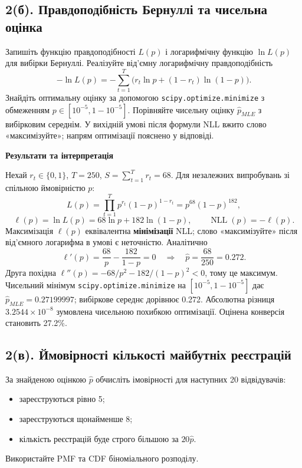 \documentclass[11pt,a4paper]{article}
\newcommand{\pythoncode}[1]{%
  \Needspace{6\baselineskip}
  \begin{tcolorbox}[enhanced,breakable,colback=black!2!white,colframe=black!15!white,
    colbacktitle=black!6!white,coltitle=accent,fonttitle=\bfseries\small,
    title=Код Python,title after break={Код Python (продовження)},boxrule=0.4pt,arc=1mm,left=2mm,right=2mm,top=2mm,bottom=2mm,
    before skip=6pt,after skip=8pt]
  
  \end{tcolorbox}}
\newcommand{\answerheading}{\Needspace{4\baselineskip}\par\medskip
  {\color{answergreen}\bfseries Результати та інтерпретація}\par\smallskip}
\begin{document}
\subsection*{2(б). Правдоподібність Бернуллі та чисельна оцінка}
\begin{taskstatement}
Запишіть функцію правдоподібності $L(p)$ і логарифмічну функцію $\ln L(p)$ для вибірки Бернуллі.
Реалізуйте від’ємну логарифмічну правдоподібність
\[
-\ln L(p)=-\sum_{t=1}^{T}\bigl(r_t\ln p+(1-r_t)\ln(1-p)\bigr).
\]
Знайдіть оптимальну оцінку за допомогою \texttt{scipy.optimize.minimize} з обмеженням $p\in[10^{-5},1-10^{-5}]$.
Порівняйте чисельну оцінку $\widehat p_{MLE}$ з вибірковим середнім.
У вихідній умові після формули NLL вжито слово «максимізуйте»; напрям оптимізації пояснено у відповіді.
\end{taskstatement}


\pythoncode{part2-cell7}
\answerheading
Нехай \(r_t\in\{0,1\}\), \(T=250\), \(S=\sum_{t=1}^T r_t=68\). Для незалежних випробувань зі спільною ймовірністю \(p\): \[L(p)=\prod_{t=1}^{T}p^{r_t}(1-p)^{1-r_t}=p^{68}(1-p)^{182},\] \[\ell(p)=\ln L(p)=68\ln p+182\ln(1-p),\qquad \operatorname{NLL}(p)=-\ell(p).\] Максимізація \(\ell(p)\) еквівалентна \textbf{мінімізації} NLL; слово «максимізуйте» після від'ємного логарифма в умові є неточністю. Аналітично \[\ell'(p)=\frac{68}{p}-\frac{182}{1-p}=0\quad\Longrightarrow\quad\widehat p=\frac{68}{250}=0.272.\] Друга похідна \(\ell''(p)=-68/p^2-182/(1-p)^2<0\), тому це максимум. Чисельний мінімум \texttt{scipy.optimize.minimize} на \([10^{-5},1-10^{-5}]\) дає \(\widehat p_{MLE}=0.27199997\); вибіркове середнє дорівнює 0.272. Абсолютна різниця \(3.2544\times 10^{-8}\) зумовлена чисельною похибкою оптимізації. Оцінена конверсія становить 27.2\%.
\subsection*{2(в). Ймовірності кількості майбутніх реєстрацій}
\begin{taskstatement}
За знайденою оцінкою $\widehat p$ обчисліть імовірності для наступних 20 відвідувачів:
\begin{itemize}
\item зареєструються рівно 5;
\item зареєструються щонайменше 8;
\item кількість реєстрацій буде строго більшою за $20\widehat p$.
\end{itemize}
Використайте PMF та CDF біноміального розподілу.
\end{taskstatement}
\end{document}
